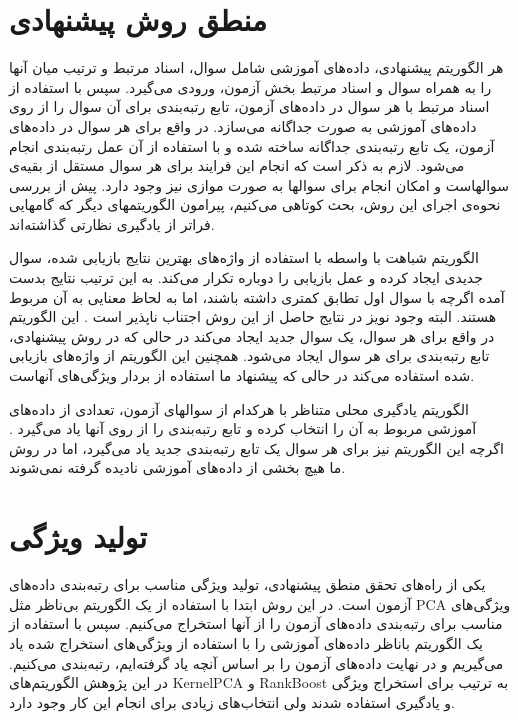 \documentclass{article}
\begin{document}
\section{منطق روش پیشنهادی}
هر الگوریتم پیشنهادی، داده‌های آموزشی شامل سوال، اسناد مرتبط و ترتیب میان آنها را به همراه سوال و اسناد مرتبط بخش آزمون، ورودی می‌گیرد. سپس با استفاده از اسناد مرتبط با هر سوال در داده‌های آزمون، تابع رتبه‌بندی برای آن سوال را از روی داده‌های آموزشی به صورت جداگانه می‌سازد. در واقع برای هر سوال در داده‌های آزمون، یک تابع رتبه‌بندی جداگانه ساخته شده و با استفاده از آن عمل رتبه‌بندی انجام می‌شود. لازم به ذکر است که انجام این فرایند برای هر سوال مستقل از بقیه‌ی سوالهاست و امکان انجام برای سوالها به صورت موازی نیز وجود دارد. پیش از بررسی نحوه‌ی اجرای این روش، بحث کوتاهی می‌کنیم، پیرامون الگوریتمهای دیگر که گامهایی فراتر از یادگیری نظارتی گذاشته‌اند.

الگوریتم شباهت با واسطه با استفاده از واژه‌های بهترین نتایج بازیابی شده، سوال جدیدی ایجاد کرده و عمل بازیابی را دوباره تکرار می‌کند. به این ترتیب نتایج بدست آمده اگرچه با سوال اول تطابق کمتری داشته باشند، اما به لحاظ معنایی به آن مربوط هستند. البته وجود نویز در نتایج حاصل از این روش اجتناب ناپذیر است \cite{pseudo-relevance}. این الگوریتم در واقع برای هر سوال، یک سوال جدید ایجاد می‌کند در حالی که در روش پیشنهادی، تابع رتبه‌بندی برای هر سوال ایجاد می‌شود. همچنین این الگوریتم از واژه‌های بازیابی شده استفاده می‌کند در حالی که پیشنهاد ما استفاده از بردار ویژگی‌های آنهاست.

الگوریتم یادگیری محلی متناظر با هرکدام از سوالهای آزمون، تعدادی از داده‌های آموزشی مربوط به آن را انتخاب کرده و تابع رتبه‌بندی را از روی آنها یاد می‌گیرد \cite{local-learning}. اگرچه این الگوریتم نیز برای هر سوال یک تابع رتبه‌بندی جدید یاد می‌گیرد، اما در روش ما هیچ بخشی از داده‌های آموزشی نادیده گرفته نمی‌شوند.

\section{تولید ویژگی}
یکی از راه‌های تحقق منطق پیشنهادی، تولید ویژگی مناسب برای رتبه‌بندی داده‌های آزمون است. در این روش ابتدا با استفاده از یک الگوریتم بی‌ناظر مثل PCA ویژگی‌های مناسب برای رتبه‌بندی داده‌های آزمون را از آنها استخراج می‌کنیم. سپس با استفاده از یک الگوریتم باناظر داده‌های آموزشی را با استفاده از ویژگی‌های استخراج شده یاد می‌گیریم و در نهایت داده‌های آزمون را بر اساس آنچه یاد گرفته‌ایم، رتبه‌بندی می‌کنیم. در این پژوهش الگوریتم‌های KernelPCA و RankBoost به ترتیب برای استخراج ویژگی و یادگیری استفاده شدند ولی انتخاب‌های زیادی برای انجام  این کار وجود دارد.   
\end{document}

